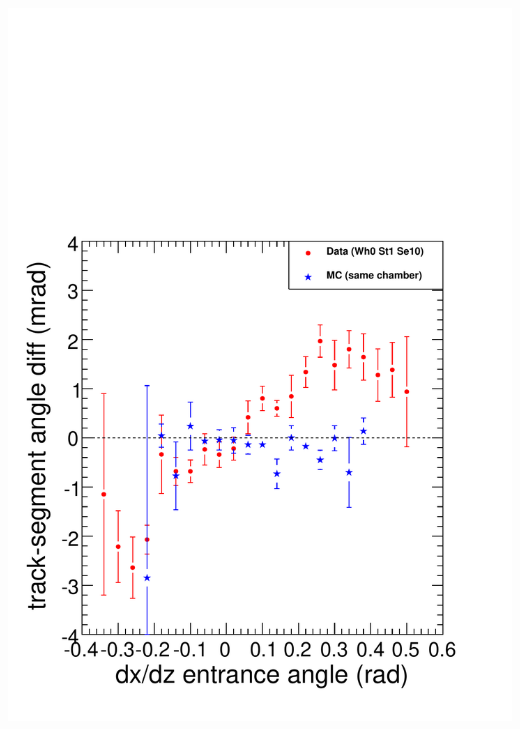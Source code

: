 \documentclass[compress]{beamer}
\begin{document}
\begin{frame}
\begin{columns}
\includegraphics[width=\linewidth]{strange_correlation.pdf}
\end{columns}
\end{frame}
\end{document}
